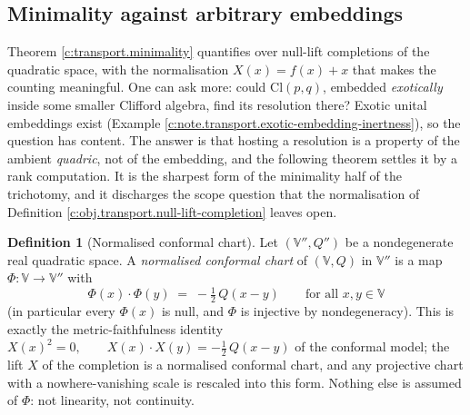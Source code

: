 \documentclass[11pt]{article}
\theoremstyle{definition}
\newtheorem{definition}[theorem]{Definition}
\theoremstyle{plain}
\providecommand{\Cl}{}\renewcommand{\Cl}{\mathrm{Cl}}
\begin{document}
\subsection*{Minimality against arbitrary embeddings}
\label{c:note.transport.setting-minimality-against-arbitrary-embeddings}
Theorem \ref{c:transport.minimality} quantifies over null-lift completions of the quadratic space, with the normalisation $X(x) = f(x) + x$ that makes the counting meaningful. One can ask more: could $\Cl(p,q)$, embedded \emph{exotically} inside some smaller Clifford algebra, find its resolution there? Exotic unital embeddings exist (Example \ref{c:note.transport.exotic-embedding-inertness}), so the question has content. The answer is that hosting a resolution is a property of the ambient \emph{quadric}, not of the embedding, and the following theorem settles it by a rank computation. It is the sharpest form of the minimality half of the trichotomy, and it discharges the scope question that the normalisation of Definition \ref{c:obj.transport.null-lift-completion} leaves open.

\begin{definition}[Normalised conformal chart]\label{c:obj.transport.normalised-conformal-chart}
Let $(\mathbb{V}'', Q'')$ be a nondegenerate real quadratic space. A \emph{normalised conformal chart} of $(\mathbb{V}, Q)$ in $\mathbb{V}''$ is a map $\Phi : \mathbb{V} \to \mathbb{V}''$ with
\[
\Phi(x) \cdot \Phi(y) \;=\; -\tfrac12\, Q(x - y) \qquad \text{for all } x, y \in \mathbb{V}
\]
(in particular every $\Phi(x)$ is null, and $\Phi$ is injective by nondegeneracy). This is exactly the metric-faithfulness identity $X(x)^2 = 0, \qquad X(x)\cdot X(y) = -\tfrac12\, Q(x-y)$ of the conformal model; the lift $X$ of the completion is a normalised conformal chart, and any projective chart with a nowhere-vanishing scale is rescaled into this form. Nothing else is assumed of $\Phi$: not linearity, not continuity.
\end{definition}
\end{document}
